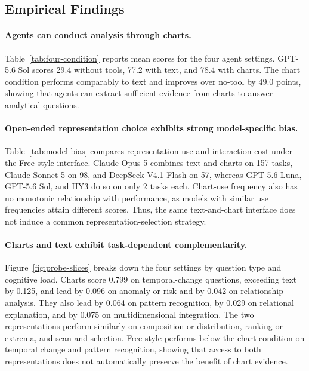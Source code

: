 \documentclass{article}
\begin{document}
\subsection{Empirical Findings}
\label{sec:probe-findings}

\paragraph{Agents can conduct analysis through charts.}
Table~\ref{tab:four-condition} reports mean scores for the four agent settings.
GPT-5.6 Sol scores 29.4 without tools, 77.2 with text, and 78.4 with charts.
The chart condition performs comparably to text and improves over no-tool by 49.0 points, showing that agents can extract sufficient evidence from charts to answer analytical questions.

\paragraph{Open-ended representation choice exhibits strong model-specific bias.}
Table~\ref{tab:model-bias} compares representation use and interaction cost under the Free-style interface.
Claude Opus 5 combines text and charts on 157 tasks, Claude Sonnet 5 on 98, and DeepSeek V4.1 Flash on 57, whereas GPT-5.6 Luna, GPT-5.6 Sol, and HY3 do so on only 2 tasks each.
Chart-use frequency also has no monotonic relationship with performance, as models with similar use frequencies attain different scores.
Thus, the same text-and-chart interface does not induce a common representation-selection strategy.


\paragraph{Charts and text exhibit task-dependent complementarity.}
Figure~\ref{fig:probe-slices} breaks down the four settings by question type and cognitive load.
Charts score 0.799 on temporal-change questions, exceeding text by 0.125, and lead by 0.096 on anomaly or risk and by 0.042 on relationship analysis.
They also lead by 0.064 on pattern recognition, by 0.029 on relational explanation, and by 0.075 on multidimensional integration.
The two representations perform similarly on composition or distribution, ranking or extrema, and scan and selection.
Free-style performs below the chart condition on temporal change and pattern recognition, showing that access to both representations does not automatically preserve the benefit of chart evidence.
\end{document}
